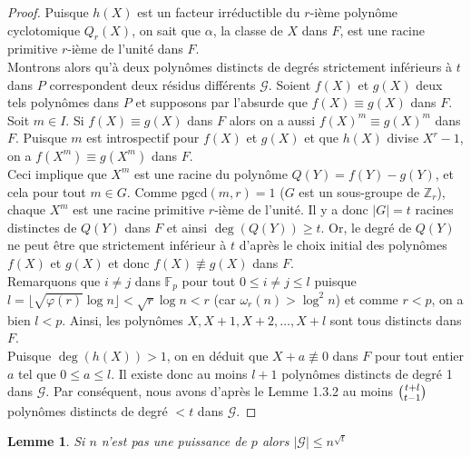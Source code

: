 \documentclass[11pt]{article}
\newtheorem{lemm}{Lemme}[subsection]
\newcommand{\pgcd}{\mathrm{pgcd}}
\begin{document}
\begin{small}
\begin{proof}
Puisque $h(X)$ est un facteur irréductible du $r$-ième polynôme cyclotomique $Q_r(X)$, on sait que $\alpha$, la classe de $X$ dans $F$, est une racine primitive $r$-ième de l'unité dans $F$.\\

\noindent
Montrons alors qu'à deux polynômes distincts de degrés strictement inférieurs à $t$ dans $P$ correspondent deux résidus différents $\mathcal{G}$. Soient $f(X)$ et $g(X)$ deux tels polynômes dans $P$ et supposons par l'absurde que $f(X) \equiv g(X)$ dans $F$.\\

\noindent
Soit $m \in I$. Si $f(X) \equiv g(X)$ dans $F$ alors on a aussi $f(X)^m \equiv g(X)^m$ dans $F$. Puisque $m$ est introspectif pour $f(X)$ et $g(X)$ et que $h(X)$ divise $X^r-1$, on a $f(X^m) \equiv g(X^m)$ dans $F$.\\

\noindent
Ceci implique que $X^m$ est une racine du polynôme $Q(Y)=f(Y)-g(Y)$, et cela pour tout $m \in G$. Comme $\pgcd(m,r)=1$ ($G$ est un sous-groupe de $\mathbb{Z}_r$), chaque $X^m$ est une racine primitive $r$-ième de l'unité. Il y a donc $\vert G \vert = t$ racines distinctes de $Q(Y)$ dans $F$ et ainsi $\deg(Q(Y)) \geqslant t$. Or, le degré de $Q(Y)$ ne peut être que strictement inférieur à $t$ d'après le choix initial des polynômes $f(X)$ et $g(X)$ et donc $f(X) \not \equiv g(X)$ dans $F$.\\

\noindent
Remarquons que $i \not = j$ dans $\mathbb{F}_p$ pour tout $0 \leqslant i \not = j \leqslant l$ puisque $l=\lfloor \sqrt{\varphi(r)} \log n \rfloor < \sqrt{r} \log n < r$ (car $\omega_r(n) > \log^2 n$) et comme $r<p$, on a bien $l<p$. Ainsi, les polynômes $X, X+1, X+2, \dots, X+l$ sont tous distincts dans $F$.\\

\noindent
Puisque $\deg(h(X)) >1$, on en déduit que $X+a \not \equiv 0$ dans $F$ pour tout entier $a$ tel que $0 \leqslant a \leqslant l$. Il existe donc au moins $l+1$ polynômes distincts de degré 1 dans $\mathcal{G}$. Par conséquent, nous avons d'après le Lemme 1.3.2 au moins $\tbinom{t+l}{t-1}$ polynômes distincts de degré $<t$ dans $\mathcal{G}$.
\end{proof}
\end{small}

\begin{lemm}
Si $n$ n'est pas une puissance de $p$ alors $\vert \mathcal{G} \vert \leqslant n^{\sqrt{t}}$
\end{lemm}
\end{document}
